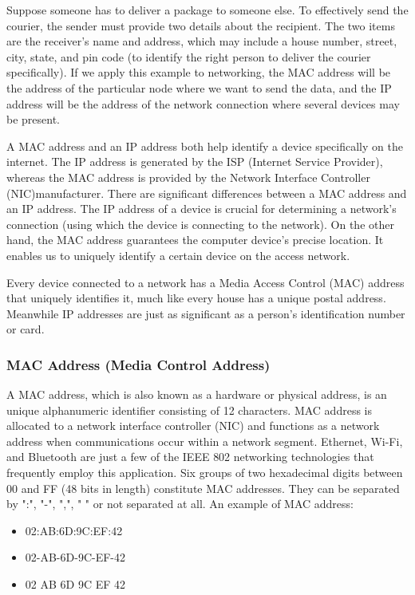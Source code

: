 \documentclass{article}
\begin{document}
Suppose someone has to deliver a package to someone else. To effectively send the courier, the sender must provide two details about the recipient. The two items are the receiver's name and address, which may include a house number, street, city, state, and pin code (to identify the right person to deliver the courier specifically). If we apply this example to networking, the MAC address will be the address of the particular node where we want to send the data, and the IP address will be the address of the network connection where several devices may be present.

A MAC address and an IP address both help identify a device specifically on the internet. The IP address is generated by the ISP (Internet Service Provider), whereas the MAC address is provided by the Network Interface Controller (NIC)manufacturer. There are significant differences between a MAC address and an IP address. The IP address of a device is crucial for determining a network's connection (using which the device is connecting to the network). On the other hand, the MAC address guarantees the computer device's precise location. It enables us to uniquely identify a certain device on the access network.

Every device connected to a network has a Media Access Control (MAC) address that uniquely identifies it, much like every house has a unique postal address. Meanwhile IP addresses are just as significant as a person's identification number or card. 

\subsubsection{MAC Address (Media Control Address)}

A MAC address, which is also known as a hardware or physical address, is an unique alphanumeric identifier consisting of 12 characters. MAC address is allocated to a network interface controller (NIC) and functions as a network address when communications occur within a network segment. Ethernet, Wi-Fi, and Bluetooth are just a few of the IEEE 802 networking technologies that frequently employ this application. Six groups of two hexadecimal digits between 00 and FF (48 bits in length) constitute MAC addresses. They can be separated by ":", "-", ",", " " or not separated at all. An example of MAC address:
\begin{itemize}
    \item 02:AB:6D:9C:EF:42
    \item 02-AB-6D-9C-EF-42
    \item 02 AB 6D 9C EF 42
\end{itemize}
\end{document}
